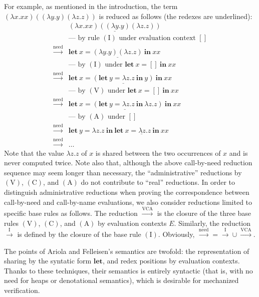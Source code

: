 \documentclass[english]{sumiilab-paper}
\newcommand{\LET}[3]{\mathbf{let}~#1=#2~\mathbf{in}~#3}
\newcommand{\CALLBYNEED}{\xrightarrow{\mathrm{need}}}
\newcommand{\CALLBYNEEDI}{\xrightarrow{\mathrm{I}}}
\newcommand{\CALLBYNEEDVCA}{\xrightarrow{\mathrm{VCA}}}
\begin{document}
For example, as mentioned in the introduction, the term
$(\lambda x.xx)((\lambda y.y)(\lambda z.z))$
is reduced as follows (the redexes are underlined):
\[ \begin{array}{ll}
	& \underline{(\lambda x.xx)((\lambda y.y)(\lambda z.z))} \\
	& \mbox{--- by rule $(\mbox{I})$ under evaluation context $[]$} \\
	\CALLBYNEED & \LET{x}{\underline{(\lambda y.y)(\lambda z.z)}}{xx}\\
	& \mbox{--- by $(\mbox{I})$ under $\LET{x}{[]}{xx}$} \\
	\CALLBYNEED & \LET{x}{\underline{(\LET{y}{\lambda z.z}{y})}}{xx} \\
	& \mbox{--- by $(\mbox{V})$ under $\LET{x}{[]}{xx}$} \\
	\CALLBYNEED & \underline{\LET{x}{(\LET{y}{\lambda z.z}{\lambda z.z})}{xx}} \\
	& \mbox{--- by $(\mbox{A})$ under $[]$} \\
	\CALLBYNEED & \LET{y}{\lambda z.z}{\underline{\LET{x}{\lambda z.z}{xx}}} \\
	\CALLBYNEED & \dots
\end{array} \]
Note that the value $\lambda z.z$ of $x$ is shared between the two occurrences of $x$ and is never computed twice.  Note also that, although the above call-by-need reduction sequence may seem longer than necessary, the ``administrative'' reductions by $(\mbox{V})$, $(\mbox{C})$, and $(\mbox{A})$ do not contribute to ``real'' reductions.
%
In order to distinguish administrative reductions when proving the correspondence between call-by-need and call-by-name evaluations,
we also consider reductions limited to specific base rules as follows.
The reduction $\CALLBYNEEDVCA$ is the closure of the three base rules $(\mbox{V})$, $(\mbox{C})$, and $(\mbox{A})$ by evaluation contexts $E$.
Similarly, the reduction $\CALLBYNEEDI$ is defined by the closure of the base rule $(\mbox{I})$.
Obviously, ${\CALLBYNEED} = {\CALLBYNEEDI}\cup{\CALLBYNEEDVCA}$.

The points of Ariola and Felleisen's semantics are twofold:
the representation of sharing by the syntatic form $\mathbf{let}$,
and redex positions by evaluation contexts.
Thanks to these techniques, their semantics is entirely syntactic
(that is, with no need for heaps or denotational semantics),
which is desirable for mechanized verification.
\end{document}

